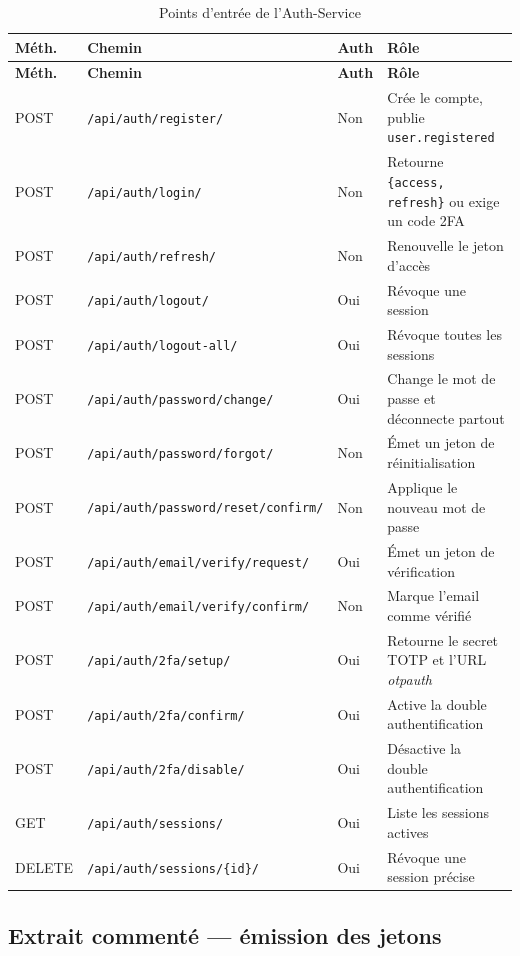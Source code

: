 \documentclass[11pt,a4paper,oneside]{report}
\newcommand{\code}[1]{\texttt{\small #1}}
\begin{document}
\begin{longtable}{@{}p{1.4cm}p{6.1cm}p{1.3cm}p{5.1cm}@{}}
\caption{Points d'entrée de l'Auth-Service}\label{tab:ep-auth}\\
\toprule
\textbf{Méth.} & \textbf{Chemin} & \textbf{Auth} & \textbf{Rôle} \\
\midrule
\endfirsthead
\toprule
\textbf{Méth.} & \textbf{Chemin} & \textbf{Auth} & \textbf{Rôle} \\
\midrule
\endhead
\bottomrule
\endlastfoot
POST & \code{/api/auth/register/} & Non & Crée le compte, publie \code{user.registered} \\
POST & \code{/api/auth/login/} & Non & Retourne \code{\{access, refresh\}} ou exige un code 2FA \\
POST & \code{/api/auth/refresh/} & Non & Renouvelle le jeton d'accès \\
POST & \code{/api/auth/logout/} & Oui & Révoque une session \\
POST & \code{/api/auth/logout-all/} & Oui & Révoque toutes les sessions \\
POST & \code{/api/auth/password/change/} & Oui & Change le mot de passe et déconnecte partout \\
POST & \code{/api/auth/password/forgot/} & Non & Émet un jeton de réinitialisation \\
POST & \code{/api/auth/password/reset/confirm/} & Non & Applique le nouveau mot de passe \\
POST & \code{/api/auth/email/verify/request/} & Oui & Émet un jeton de vérification \\
POST & \code{/api/auth/email/verify/confirm/} & Non & Marque l'email comme vérifié \\
POST & \code{/api/auth/2fa/setup/} & Oui & Retourne le secret TOTP et l'URL \emph{otpauth} \\
POST & \code{/api/auth/2fa/confirm/} & Oui & Active la double authentification \\
POST & \code{/api/auth/2fa/disable/} & Oui & Désactive la double authentification \\
GET & \code{/api/auth/sessions/} & Oui & Liste les sessions actives \\
DELETE & \code{/api/auth/sessions/\{id\}/} & Oui & Révoque une session précise \\
\end{longtable}

\subsection{Extrait commenté — émission des jetons}
\end{document}
